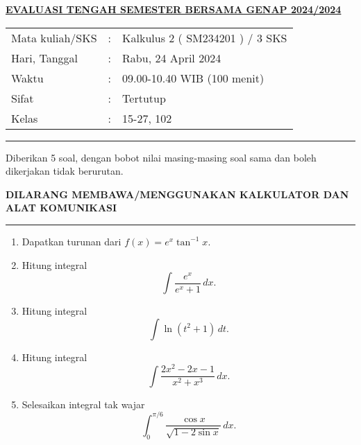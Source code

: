 \documentclass[11pt,openany,a4paper]{article}
\begin{document}
    \newpage
    \pagestyle{problems}

    \begin{center}
	{\underline{\textbf{\MakeUppercase{Evaluasi Tengah Semester Bersama Genap 2024/2024}}}}
    \end{center}

    \begin{center}
	\begin{tabular}{lcl}
		Mata kuliah/SKS & : & Kalkulus 2 ( SM234201 ) / 3 SKS\\
		Hari, Tanggal & : & Rabu, 24 April 2024\\
		Waktu & : & 09.00-10.40 WIB (100 menit)\\
		Sifat & : & Tertutup\\
		Kelas & : & 15-27, 102
	\end{tabular}
    \end{center}
	
    \noindent\rule{\textwidth}{2.pt}
	
    \setlength{\parindent}{5pt}
    \par Diberikan 5 soal, dengan bobot nilai masing-masing soal sama dan boleh dikerjakan tidak berurutan.
    \setlength{\parindent}{5pt}
    \setlength{\parindent}{5pt}
    {\small
    \par \textbf{\MakeUppercase{Dilarang membawa/menggunakan kalkulator dan alat komunikasi}}
    }
    \par {}
	
    \noindent\rule{\textwidth}{2.pt}
	
\begin{enumerate}
  \item Dapatkan turunan dari \( f(x) = e^x \tan^{-1} x \).
  
  \item Hitung integral
  \[
  \int \frac{e^x}{e^x + 1} \, dx.
  \]
  
  \item Hitung integral
  \[
  \int \ln(t^2 + 1) \, dt.
  \]
  
  \item Hitung integral
  \[
  \int \frac{2x^2 - 2x - 1}{x^2 + x^3} \, dx.
  \]
  
  \item Selesaikan integral tak wajar
  \[
  \int_0^{\pi/6} \frac{\cos x}{\sqrt{1 - 2 \sin x}} \, dx.
  \]
\end{enumerate}
	
\end{document}
